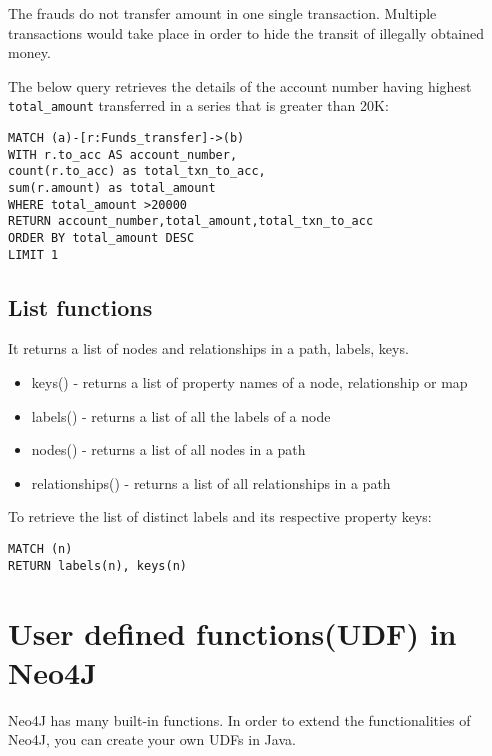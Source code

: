 \documentclass[../main.tex]{subfiles}
\begin{document}
The frauds do not transfer amount in one single transaction.
Multiple transactions would take place in order to hide the transit of illegally obtained money.

The below query retrieves the details of the account number having highest \lstinline{total_amount} transferred in a series that is greater than 20K:
\begin{lstlisting}[language=cypher]
MATCH (a)-[r:Funds_transfer]->(b)
WITH r.to_acc AS account_number,
count(r.to_acc) as total_txn_to_acc,
sum(r.amount) as total_amount
WHERE total_amount >20000
RETURN account_number,total_amount,total_txn_to_acc
ORDER BY total_amount DESC
LIMIT 1
\end{lstlisting}

\subsection{List functions}
It returns a list of nodes and relationships in a path, labels, keys.

\begin{itemize}
	\item{keys() - returns a list of property names of a node, relationship or map}
	\item{labels() - returns a list of all the labels of a node}
	\item{nodes() - returns a list of all nodes in a path}
	\item{relationships() - returns a list of all relationships in a path}
\end{itemize}
To retrieve the list of distinct labels and its respective property keys:
\begin{lstlisting}[language=cypher]
MATCH (n)
RETURN labels(n), keys(n)
\end{lstlisting}

\section{User defined functions(UDF) in Neo4J}
Neo4J has many built-in functions. In order to extend the functionalities of Neo4J, you can create your own UDFs  in Java.
\end{document}
